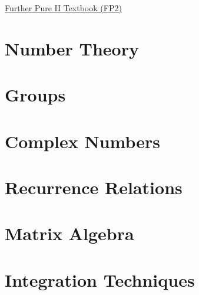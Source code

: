 \href{https://drive.google.com/drive/folders/13SmG6rx6WKPDzJa3Cav_TOF4B4u4sRZd}{\hypertarget{book:FP2}{Further Pure II Textbook (FP2)}}

\section{Number Theory} \label{}
\newpage
\section{Groups} \label{}
\newpage
\section{Complex Numbers} \label{}
\newpage
\section{Recurrence Relations} \label{}
\newpage
\section{Matrix Algebra} \label{}
\newpage
\section{Integration Techniques} \label{}
\newpage